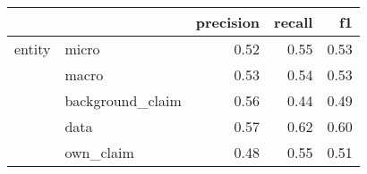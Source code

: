 \begin{tabular}{llrrr}
\toprule
       &           &  precision &  recall &   f1 \\
\midrule
entity & micro &       0.52 &    0.55 & 0.53 \\
       & macro &       0.53 &    0.54 & 0.53 \\
       & background\_claim &       0.56 &    0.44 & 0.49 \\
       & data &       0.57 &    0.62 & 0.60 \\
       & own\_claim &       0.48 &    0.55 & 0.51 \\
\bottomrule
\end{tabular}
